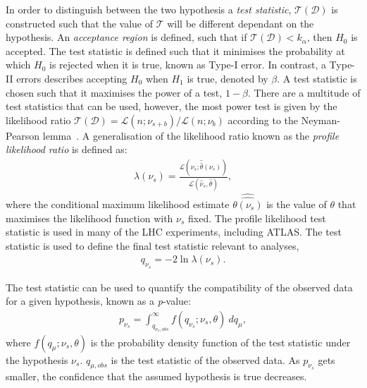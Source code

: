 In order to distinguish between the two hypothesis a \emph{test statistic}, $\mathcal{T}(\mathcal{D})$ is constructed such that the value of $\mathcal{T}$ will be different dependant on the hypothesis. An \emph{acceptance region} is defined, such that if $\mathcal{T}(\mathcal{D}) < k_\alpha$, then $H_0$ is accepted. The test statistic is defined such that it minimises the probability at which $H_0$ is rejected when it is true, known as Type-I error. In contrast, a Type-II errors describes accepting $H_0$ when $H_1$ is true, denoted by $\beta$. A test statistic is chosen such that it maximises the power of a test, $1-\beta$. There are a multitude of test statistics that can be used, however, the most power test is given by the likelihood ratio $\mathcal{T}(\mathcal{D}) = \mathcal{L}(n;\nu_{s+b})/\mathcal{L}(n;\nu_{b})$ according to the Neyman-Pearson lemma~\cite{Cowan1998}. A generalisation of the likelihood ratio known as the \emph{profile likelihood ratio} is defined as:
\begin{equation}
    \label{eq:profLL}
    \begin{aligned}
        \lambda(\nu_s) = \frac{\mathcal{L}(\nu_s;\hat{\hat{\theta}}(\nu_s))}{\mathcal{L}(\hat{\nu}_s,\hat{\theta})},
    \end{aligned}
\end{equation}
where the conditional maximum likelihood estimate $\hat{\hat{\theta(\nu_s)}}$ is the value of $\theta$ that maximises the likelihood function with $\nu_s$ fixed. The profile likelihood test statistic is used in many of the LHC experiments, including ATLAS. The test statistic is used to define the final test statistic relevant to analyses,
\begin{equation}
    \label{eq:teststat}
    \begin{aligned}
        q_{\nu_s} = -2\ln\lambda(\nu_s).
    \end{aligned}
\end{equation}

The test statistic can be used to quantify the compatibility of the observed data for a given hypothesis, known as a \emph{p}-value:
\begin{equation}
    \label{eq:pvalue}
    \begin{aligned}
        p_{\nu_s} = \int_{q_{\nu_{s},obs}}^\infty f(q_{\nu_s};\nu_s,\theta)~dq_\mu,
    \end{aligned}
\end{equation}
where $f(q_\mu;\nu_s,\theta)$ is the probability density function of the test statistic under the hypothesis $\nu_s$. $q_{\mu,obs}$ is the test statistic of the observed data. As $p_{\nu_s}$ gets smaller, the confidence that the assumed hypothesis is true decreases. 


